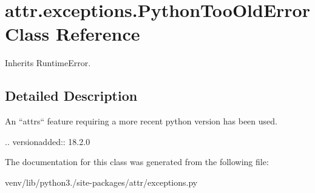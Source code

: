 \hypertarget{classattr_1_1exceptions_1_1_python_too_old_error}{}\section{attr.\+exceptions.\+Python\+Too\+Old\+Error Class Reference}
\label{classattr_1_1exceptions_1_1_python_too_old_error}


Inherits Runtime\+Error.



\subsection{Detailed Description}
\begin{DoxyVerb}An ``attrs`` feature requiring a more recent python version has been used.

.. versionadded:: 18.2.0
\end{DoxyVerb}
 

The documentation for this class was generated from the following file\+:\begin{DoxyCompactItemize}
\item 
venv/lib/python3./site-\/packages/attr/exceptions.\+py\end{DoxyCompactItemize}
